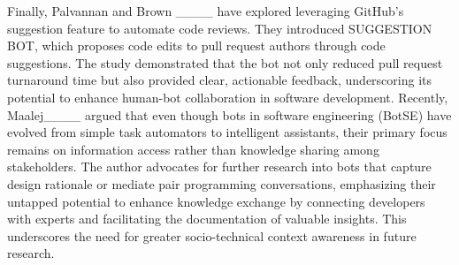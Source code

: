 Finally, Palvannan and Brown ____ have explored leveraging GitHub’s suggestion feature to automate code reviews.
They introduced SUGGESTION BOT, which proposes code edits to pull request authors through code suggestions.
The study demonstrated that the bot not only reduced pull request turnaround time but also provided clear, actionable feedback, underscoring its potential to enhance human-bot collaboration in software development.
Recently, Maalej____ argued that even though bots in software engineering (BotSE) have evolved from simple task automators to intelligent assistants, their primary focus remains on information access rather than knowledge sharing among stakeholders. 
The author advocates for further research into bots that capture design rationale or mediate pair programming conversations, emphasizing their untapped potential to enhance knowledge exchange by connecting developers with experts and facilitating the documentation of valuable insights. 
This underscores the need for greater socio-technical context awareness in future research.